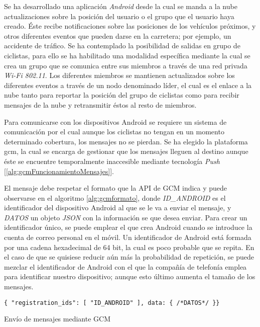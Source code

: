Se ha desarrollado una aplicación \emph{Android} desde la cual se manda a la nube
actualizaciones sobre la posición del usuario o el grupo que el usuario haya creado.
\'Este recibe notificaciones sobre las posiciones de los vehículos próximos, y otros
diferentes eventos que pueden darse en la carretera; por ejemplo, un accidente de
tráfico. Se ha contemplado la posibilidad de salidas en grupo de ciclistas, para ello
se ha habilitado una modalidad específica mediante la cual se crea un grupo que se
comunica entre sus miembros a través de una red privada \emph{Wi-Fi 802.11}. Los
diferentes miembros se mantienen actualizados sobre los diferentes eventos a través
de un nodo denominado líder, el cual es el enlace a la nube tanto para reportar la
posición del grupo de ciclistas como para recibir mensajes de la nube y retransmitir
éstos al resto de miembros.

Para comunicarse con los dispositivos Android se requiere un sistema de comunicación
por el cual aunque los ciclistas no tengan en un momento determinado cobertura, los
mensajes no se pierdan. Se ha elegido la plataforma \gls{gcm}, la cual se encarga de
gestionar que los mensajes lleguen al destino aunque éste se encuentre temporalmente
inaccesible mediante tecnología \emph{Push} [\ref{alg:gcmFuncionamientoMensajes}].

El mensaje debe respetar el formato que la API de GCM indica y puede observarse en
el algoritmo \ref{alg:gcmformato}, donde \emph{ID\_ANDROID} es el identificador del
dispositivo Android al que se le va a enviar el mensaje, y \emph{DATOS} un objeto
\emph{JSON} con la información se que desea enviar. Para crear un identificador único,
se puede emplear el que crea Android cuando se introduce la cuenta de correo personal
en el móvil. Un identificador de Android está formada por una cadena hexadecimal de
64 bit, la cual es poco probable que se repita. En el caso de que se quisiese reducir
aún más la probabilidad de repetición, se puede mezclar el identificador de Android
con el que la compañía de telefonía emplea para identificar nuestro dispositivo; aunque
esto último aumenta el tamaño de los mensajes.

\begin{listing}
	\begin{minipage}{.4\textwidth}
		\begin{verbatim}
{ "registration_ids": [ "ID_ANDROID" ], data: { /*DATOS*/ }}
		\end{verbatim}
	\end{minipage}
	\caption{Envío de mensajes mediante GCM}\label{alg:gcmformato}
\end{listing}

